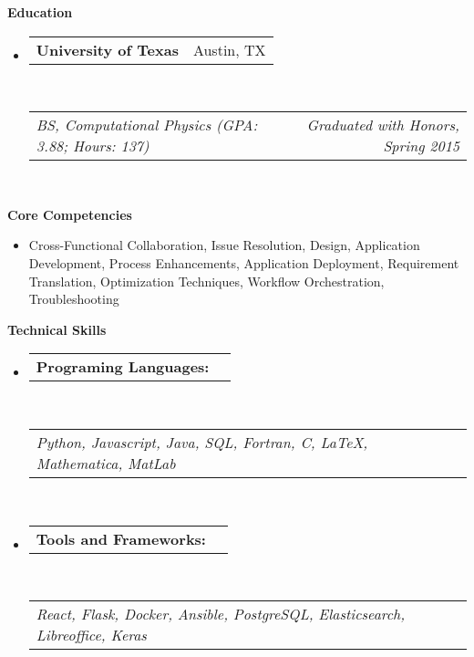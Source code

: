 \documentclass{article}
\makeatletter
\newcommand{\heading}[1]{
	\vspace{8pt}
	\textbf{\large #1}
}
\newcommand{\subheading}[2]{
	\begin{tabular*}{\textwidth-\leftmargin}{l@{\extracolsep{\fill}}r}
		\textbf{#1} & #2 \\
	\end{tabular*} \\
}
\newcommand{\itemheading}[2]{
	\vspace{1pt}
	\begin{tabular*}{\textwidth-\leftmargin}{l@{\extracolsep{\fill}}r}
		\textit{#1} & \textit{#2} \\
	\end{tabular*} \\
	\vspace{-2pt}
}
\makeatother
\begin{document}
\heading{Education}

\begin{itemize}
	\item
		\subheading{University of Texas}{Austin, TX}
		\itemheading{BS, Computational Physics (GPA: 3.88; Hours: 137)}{Graduated with Honors, Spring 2015}
\end{itemize}

\heading{Core Competencies}

\begin{itemize}
	\item[] Cross-Functional Collaboration, Issue Resolution, Design, Application Development, Process Enhancements,
	Application Deployment, Requirement Translation, Optimization Techniques, Workflow Orchestration,
	Troubleshooting
\end{itemize}

\heading{Technical Skills}

\begin{itemize}
	\item
		\subheading{Programing Languages:}{}
		\itemheading{Python, Javascript, Java, SQL, Fortran, C, \LaTeX, Mathematica, MatLab}{}
	\item
		\subheading{Tools and Frameworks:}{}
		\itemheading{React, Flask, Docker, Ansible, PostgreSQL, Elasticsearch, Libreoffice, Keras}{}
\end{itemize}
\end{document}
